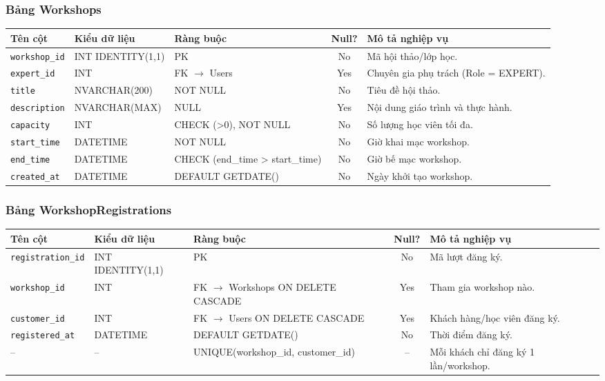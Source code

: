 \subsubsection{Bảng Workshops}
\begin{table}[H]
\centering
\small
\begin{tabularx}{\textwidth}{l l l c X}
\toprule
\textbf{Tên cột} & \textbf{Kiểu dữ liệu} & \textbf{Ràng buộc} & \textbf{Null?} & \textbf{Mô tả nghiệp vụ} \\
\midrule
\texttt{workshop\_id} & INT IDENTITY(1,1) & PK & No & Mã hội thảo/lớp học. \\
\texttt{expert\_id} & INT & FK $\rightarrow$ Users & Yes & Chuyên gia phụ trách (Role = EXPERT). \\
\texttt{title} & NVARCHAR(200) & NOT NULL & No & Tiêu đề hội thảo. \\
\texttt{description} & NVARCHAR(MAX) & NULL & Yes & Nội dung giáo trình và thực hành. \\
\texttt{capacity} & INT & CHECK (>0), NOT NULL & No & Số lượng học viên tối đa. \\
\texttt{start\_time} & DATETIME & NOT NULL & No & Giờ khai mạc workshop. \\
\texttt{end\_time} & DATETIME & CHECK (end\_time > start\_time) & No & Giờ bế mạc workshop. \\
\texttt{created\_at} & DATETIME & DEFAULT GETDATE() & No & Ngày khởi tạo workshop. \\
\bottomrule
\end{tabularx}
\end{table}

\subsubsection{Bảng WorkshopRegistrations}
\begin{table}[H]
\centering
\small
\begin{tabularx}{\textwidth}{l l l c X}
\toprule
\textbf{Tên cột} & \textbf{Kiểu dữ liệu} & \textbf{Ràng buộc} & \textbf{Null?} & \textbf{Mô tả nghiệp vụ} \\
\midrule
\texttt{registration\_id}& INT IDENTITY(1,1) & PK & No & Mã lượt đăng ký. \\
\texttt{workshop\_id} & INT & FK $\rightarrow$ Workshops ON DELETE CASCADE & Yes & Tham gia workshop nào. \\
\texttt{customer\_id} & INT & FK $\rightarrow$ Users ON DELETE CASCADE & Yes & Khách hàng/học viên đăng ký. \\
\texttt{registered\_at} & DATETIME & DEFAULT GETDATE() & No & Thời điểm đăng ký. \\
-- & -- & UNIQUE(workshop\_id, customer\_id) & -- & Mỗi khách chỉ đăng ký 1 lần/workshop. \\
\bottomrule
\end{tabularx}
\end{table}

